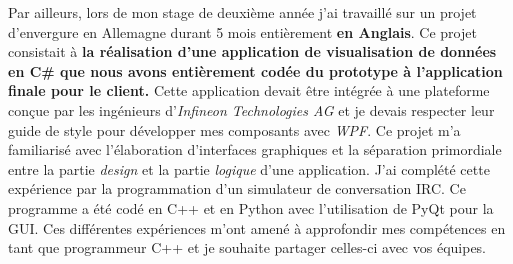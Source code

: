 Par ailleurs, lors de mon stage de deuxième année j'ai travaillé sur un projet d'envergure en Allemagne durant 5 mois entièrement \textbf{en Anglais}. Ce projet consistait à \textbf{la réalisation d'une application de visualisation de données en C\# que nous avons entièrement codée du prototype à l'application finale pour le client.} Cette application devait être intégrée à une plateforme conçue par les ingénieurs d'\textit{Infineon Technologies AG} et je devais respecter leur guide de style pour développer mes composants avec \textit{WPF}. Ce projet m'a familiarisé avec l'élaboration d'interfaces graphiques et la séparation primordiale entre la partie \textit{design} et la partie \textit{logique} d'une application. J'ai complété cette expérience par la programmation d'un simulateur de conversation IRC. Ce programme a été codé en C++ et en Python avec l'utilisation de PyQt pour la GUI. Ces différentes expériences m'ont amené à approfondir mes compétences en tant que programmeur C++ et je souhaite partager celles-ci avec vos équipes.

\makeletterclosing
